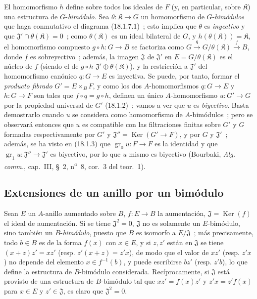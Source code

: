 \begin{env}[18.1.7]
El homomorfismo $h$ define sobre todos los ideales de $F$ (y, en particular, sobre
$\mathfrak{K}$) una estructura de $G$-\emph{bimódulo}. Sea
$\theta:\mathfrak{K}\to G$ un homomorfismo de $G$-\emph{bimódulos} que haga
conmutativo el diagrama (18.1.7.1)~; esto implica que $\theta$ es
\emph{inyectivo} y que $\mathfrak{J}'\cap\theta(\mathfrak{K})=0$~; como
$\theta(\mathfrak{K})$ es un ideal bilateral de $G$, y
$h(\theta(\mathfrak{K}))=\mathfrak{K}$, el homomorfismo compuesto
$g\circ h:G\to B$ se factoriza como
$G\xrightarrow{q}G/\theta(\mathfrak{K})\xrightarrow{f}B$, donde $f$ es
sobreyectivo~; además, la imagen $\mathfrak{J}$ de $\mathfrak{J}'$ en
$E=G/\theta(\mathfrak{K})$ es el núcleo de $f$ (siendo el de $g\circ h$
$\mathfrak{J}'\oplus\theta(\mathfrak{K})$), y la restricción a
$\mathfrak{J}'$ del homomorfismo canónico $q:G\to E$ es inyectiva. Se
puede, por tanto, formar el \emph{producto fibrado} $G'=E\times_BF$, y como los dos
$A$-homomorfismos $q:G\to E$ y $h:G\to F$ son tales que
$f\circ q=g\circ h$, definen un único $A$-homomorfismo $u:G'\to G$
por la propiedad universal de $G'$ (18.1.2)~; vamos a ver que $u$ es
\emph{biyectivo}. Basta demostrarlo cuando $u$ se considera como
homomorfismo de $A$-bimódulos~; pero se observará entonces que $u$ es compatible
con las filtraciones finitas sobre $G'$ y $G$ formadas respectivamente por $G'$
y $\mathfrak{J}''=\operatorname{Ker}(G'\to F)$, y por $G$ y
$\mathfrak{J}'$~; además, se ha visto en (18.1.3) que
$\operatorname{gr}_0u:F\to F$ es la identidad y que
$\operatorname{gr}_1u:\mathfrak{J}''\to\mathfrak{J}'$ es biyectivo, por lo que $u$
mismo es biyectivo (Bourbaki, \emph{Alg. comm.}, cap.~III, \S~2,
n\textsuperscript{o}~8, cor.~3 del teor.~1).
\end{env}

\subsection{Extensiones de un anillo por un bimódulo}
\label{subsection:0.18.2-fr}

\begin{env}[18.2.1]
\label{0.18.2.1-fr}
Sean $E$ un $A$-anillo aumentado sobre $B$, $f:E\to B$ la aumentación,
$\mathfrak{J}=\operatorname{Ker}(f)$ el ideal de aumentación. Si se tiene
$\mathfrak{J}^2=0$, $\mathfrak{J}$ no es solamente un $E$-bimódulo, sino
también un $B$-\emph{bimódulo}, puesto que $B$ es isomorfo a
$E/\mathfrak{J}$~; más precisamente, todo $b\in B$ es de la forma $f(x)$
con $x\in E$, y si $z,z'$ están en $\mathfrak{J}$ se tiene
$(x+z)z'=xz'$ (resp. $z'(x+z)=z'x$), de modo que el valor de $xz'$ (resp.
$z'x$) no depende del elemento $x\in f^{-1}(b)$, y puede escribirse $bz'$
(resp. $z'b$), lo que define la estructura de $B$-bimódulo considerada.
Recíprocamente, si $\mathfrak{J}$ está provisto de una estructura de $B$-bimódulo tal
que $xz'=f(x)z'$ y $z'x=z'f(x)$ para $x\in E$ y
$z'\in\mathfrak{J}$, es claro que $\mathfrak{J}^2=0$.
\end{env}

